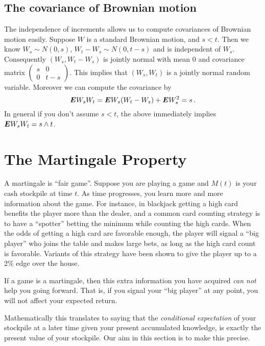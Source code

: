 \subsection{The covariance of Brownian motion}

The independence of increments allows us to compute covariances of Brownian motion easily.
Suppose $W$ is a standard Brownian motion, and $s < t$.
Then we know $W_s \sim N(0, s)$, $W_t - W_s \sim N(0, t - s)$ and is independent of $W_s$.
Consequently $(W_s, W_t - W_s)$ is jointly normal with mean $0$ and covariance matrix $(\begin{smallmatrix} s & 0\\ 0 & t-s \end{smallmatrix})$.
This implies that $(W_s, W_t)$ is a jointly normal random variable.
Moreover we can compute the covariance by
\begin{equation*}
  \bm{E} W_s W_t  = \bm{E} W_s (W_t - W_s) + \bm{E} W_s^2 = s\,.
\end{equation*}
In general if you don't assume $s < t$, the above immediately implies $\bm{E} W_s W_t = s \wedge t$.

\section{The Martingale Property}

A martingale is ``fair game''.
Suppose you are playing a game and $M(t)$ is your cash stockpile at time $t$.
As time progresses, you learn more and more information about the game.
For instance, in blackjack getting a high card benefits the player more than the dealer, and a common card counting strategy is to have a ``spotter'' betting the minimum while counting the high cards.
When the odds of getting a high card are favorable enough, the player will signal a ``big player'' who joins the table and makes large bets, as long as the high card count is favorable.
Variants of this strategy have been shown to give the player up to a 2\% edge over the house.

If a game is a martingale, then this extra information you have acquired \emph{can not} help you going forward. 
That is, if you signal your ``big player'' at any point, you will not affect your expected return.

Mathematically this translates to saying that the \emph{conditional expectation} of your stockpile at a later time given your present accumulated knowledge, is exactly the present value of your stockpile.
Our aim in this section is to make this precise.

